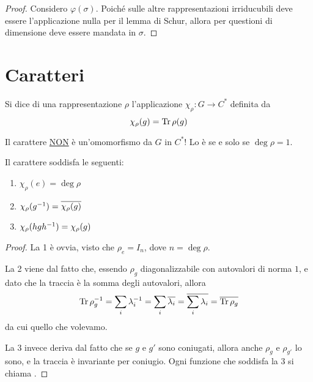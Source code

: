 \documentclass[a4paper,10pt,oneside]{math_article}
\renewcommand{\phi}{\varphi}
\newcommand{\id}{I}
\let\conj\overline
\begin{document}
    \begin{proof}
     Considero $\phi(\sigma)$. Poiché sulle altre rappresentazioni irriducubili deve essere l'applicazione nulla per il lemma di Schur, allora per questioni di dimensione deve essere mandata in $\sigma$.
    \end{proof}
  
  \section{Caratteri}
    
    \begin{mydef}
     Si dice  di una rappresentazione $\rho$ l'applicazione $\chi_\rho: G \rightarrow C^*$ definita da 
     \[
      \chi_\rho(g)=\operatorname{Tr} \rho(g)
     \]
    \end{mydef}
    
    \begin{Achtung}
      Il carattere \underline{NON} è un'omomorfismo da $G$ in $C^*$! Lo è se e solo se $\deg \rho = 1$. 
    \end{Achtung}

    \begin{myprop}
      Il carattere soddisfa le seguenti:
      \begin{enumerate}
       \item $\chi_\rho(e)=\deg\rho$
       \item $\chi_\rho(g\inv)=\conj{\chi_\rho(g)}$
       \item $\chi_\rho(hgh^{-1})=\chi_\rho(g)$
      \end{enumerate}

    \end{myprop}
    \begin{proof}
     La 1 è ovvia, visto che $\rho_e= \id_n$, dove $n=\deg \rho$.
     
     La 2 viene dal fatto che, essendo $\rho_g$ diagonalizzabile con autovalori di norma $1$, e dato che la traccia è la somma degli autovalori, allora
     \[
      \Tr\rho_g\inv = \sum_i \lambda_i\inv = \sum_i \conj{\lambda_i} = \conj{\sum_i \lambda_i} = \conj{\Tr\rho_g} 
     \]
     da cui quello che volevamo.
     
     La 3 invece deriva dal fatto che se $g$ e $g'$ sono coniugati, allora anche $\rho_g$ e $\rho_{g'}$ lo sono, e la traccia è invariante per coniugio. Ogni funzione che soddisfa la 3 si chiama .
    \end{proof}
    
\end{document}
